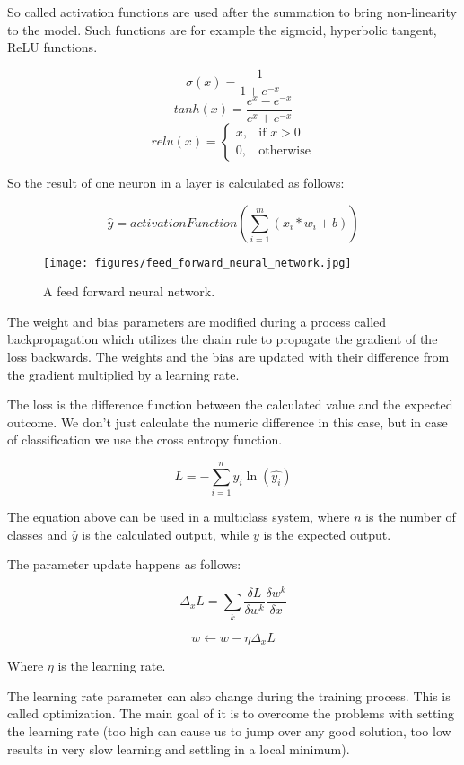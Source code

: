 So called activation functions are used after the summation to bring non-linearity to the model. Such functions are for example the sigmoid, hyperbolic tangent, ReLU functions.

\[\sigma(x) = \frac{1}{1 + e^{-x}}\]
\[tanh(x) = \frac{e^x - e^{-x}}{e^x + e^{-x}}\]
\[relu(x) = \begin{cases}
	x, & \text{if } x > 0\\
	0, & \text{otherwise}
\end{cases}\]

So the result of one neuron in a layer is calculated as follows:

\[\hat{y} = activationFunction(\sum_{i=1}^{m}(x_i * w_i + b))\]

\begin{figure}[!ht]
	\centering
	\texttt{[image: figures/feed\_forward\_neural\_network.jpg]}
	\caption{A feed forward neural network.}
	\label{fig:feed_forward}
\end{figure}

The weight and bias parameters are modified during a process called backpropagation which utilizes the chain rule to propagate the gradient of the loss backwards. The weights and the bias are updated with their difference from the gradient multiplied by a learning rate.

The loss is the difference function between the calculated value and the expected outcome. We don't just calculate the numeric difference in this case, but in case of classification we use the cross entropy function.

\[L = - \sum_{i=1}^{n} y_i \ln(\hat{y_i})\]

The equation above can be used in a multiclass system, where \(n\) is the number of classes and \(\hat{y}\) is the calculated output, while \(y\) is the expected output.

The parameter update happens as follows:

\[\Delta_x L = \sum_{k} \frac{\delta L}{\delta w^k}\frac{\delta w^k}{\delta x}\]

\[w \leftarrow w - \eta \Delta_x L\]

Where \(\eta\) is the learning rate.

The learning rate parameter can also change during the training process. This is called optimization. The main goal of it is to overcome the problems with setting the learning rate (too high can cause us to jump over any good solution, too low results in very slow learning and settling in a local minimum).

